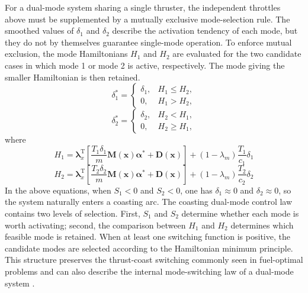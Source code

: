 \documentclass{IEEEtaes}
\begin{document}
For a dual-mode system sharing a single thruster, the independent throttles above must be supplemented by a mutually exclusive mode-selection rule. The smoothed values of $\delta_1$ and $\delta_2$ describe the activation tendency of each mode, but they do not by themselves guarantee single-mode operation. To enforce mutual exclusion, the mode Hamiltonians $H_1$ and $H_2$ are evaluated for the two candidate cases in which mode 1 or mode 2 is active, respectively. The mode giving the smaller Hamiltonian is then retained.
\begin{equation}
\delta_1^{*}=\begin{cases}
\delta_1, & H_1\leq H_2,\\
0, & H_1>H_2,
\end{cases}
\end{equation}
\begin{equation}
\delta_2^{*}=\begin{cases}
\delta_2, & H_2<H_1,\\
0, & H_2\geq H_1,
\end{cases}
\end{equation}
where
\begin{equation}
H_1=\bm{\lambda}_x^{\mathrm{T}}\left[\frac{T_1\delta_1}{m}\bm{M}(\bm{x})\bm{\alpha}^{*}+\bm{D}(\bm{x})\right]+(1-\lambda_m)\frac{T_1}{c_1}\delta_1
\end{equation}
\begin{equation}
H_2=\bm{\lambda}_x^{\mathrm{T}}\left[\frac{T_2\delta_2}{m}\bm{M}(\bm{x})\bm{\alpha}^{*}+\bm{D}(\bm{x})\right]+(1-\lambda_m)\frac{T_2}{c_2}\delta_2
\end{equation}
In the above equations, when $S_1<0$ and $S_2<0$, one has $\delta_1\approx0$ and $\delta_2\approx0$, so the system naturally enters a coasting arc. The coasting dual-mode control law contains two levels of selection. First, $S_1$ and $S_2$ determine whether each mode is worth activating; second, the comparison between $H_1$ and $H_2$ determines which feasible mode is retained. When at least one switching function is positive, the candidate modes are selected according to the Hamiltonian minimum principle. This structure preserves the thrust-coast switching commonly seen in fuel-optimal problems and can also describe the internal mode-switching law of a dual-mode system \cite{cline2024a,huang2026}.
\end{document}
